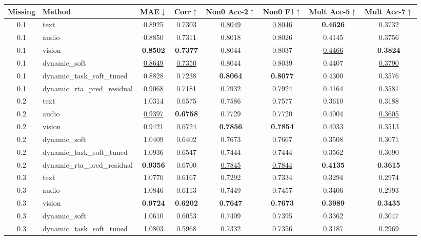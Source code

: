 \begin{table}[t]
\centering
\small
\begin{tabular}{c l c c c c c c}
\toprule
Missing & Method & MAE$\downarrow$ & Corr$\uparrow$ & Non0 Acc-2$\uparrow$ & Non0 F1$\uparrow$ & Mult Acc-5$\uparrow$ & Mult Acc-7$\uparrow$ \\ 
\midrule
0.1 & text & 0.8925 & 0.7303 & \underline{0.8049} & \underline{0.8046} & \textbf{0.4626} & 0.3732 \\ 
0.1 & audio & 0.8850 & 0.7311 & 0.8018 & 0.8026 & 0.4145 & 0.3756 \\ 
0.1 & vision & \textbf{0.8502} & \textbf{0.7377} & 0.8044 & 0.8037 & \underline{0.4466} & \textbf{0.3824} \\ 
0.1 & dynamic_soft & \underline{0.8649} & \underline{0.7350} & 0.8044 & 0.8039 & 0.4407 & \underline{0.3790} \\ 
0.1 & dynamic_task_soft_tuned & 0.8828 & 0.7238 & \textbf{0.8064} & \textbf{0.8077} & 0.4300 & 0.3576 \\ 
0.1 & dynamic_rta_pred_residual & 0.9068 & 0.7181 & 0.7932 & 0.7924 & 0.4164 & 0.3581 \\ 
0.2 & text & 1.0314 & 0.6575 & 0.7586 & 0.7577 & 0.3610 & 0.3188 \\ 
0.2 & audio & \underline{0.9397} & \textbf{0.6758} & 0.7729 & 0.7720 & 0.4004 & \underline{0.3605} \\ 
0.2 & vision & 0.9421 & \underline{0.6724} & \textbf{0.7856} & \textbf{0.7854} & \underline{0.4033} & 0.3513 \\ 
0.2 & dynamic_soft & 1.0409 & 0.6402 & 0.7673 & 0.7667 & 0.3508 & 0.3071 \\ 
0.2 & dynamic_task_soft_tuned & 1.0936 & 0.6547 & 0.7444 & 0.7444 & 0.3562 & 0.3090 \\ 
0.2 & dynamic_rta_pred_residual & \textbf{0.9356} & 0.6700 & \underline{0.7845} & \underline{0.7844} & \textbf{0.4135} & \textbf{0.3615} \\ 
0.3 & text & 1.0770 & 0.6167 & 0.7292 & 0.7334 & 0.3294 & 0.2974 \\ 
0.3 & audio & 1.0846 & 0.6113 & 0.7449 & 0.7457 & 0.3406 & 0.2993 \\ 
0.3 & vision & \textbf{0.9724} & \textbf{0.6202} & \textbf{0.7647} & \textbf{0.7673} & \textbf{0.3989} & \textbf{0.3435} \\ 
0.3 & dynamic_soft & 1.0610 & 0.6053 & 0.7409 & 0.7395 & 0.3362 & 0.3047 \\ 
0.3 & dynamic_task_soft_tuned & 1.0803 & 0.5968 & 0.7332 & 0.7356 & 0.3187 & 0.2969 \\ 

\end{tabular}
\end{table}
